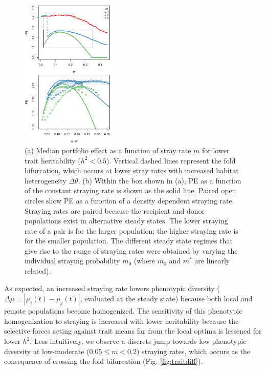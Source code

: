 \documentclass[twocolumn,preprintnumbers,amsmath,amssymb,superscriptaddress]{revtex4}
\begin{document}
\begin{figure}
  \captionsetup{justification=raggedright,
singlelinecheck=false
}
\centering
\includegraphics[width=0.4\textwidth]{figs/fig_thetaPEmvm.pdf}
\caption{
(a) Median portfolio effect as a function of stray rate $m$ for lower trait heritability ($h^2 < 0.5$).
Vertical dashed lines represent the fold bifurcation, which occurs at lower stray rates with increased habitat heterogeneity $\Delta \theta$.
(b) Within the box shown in (a), PE as a function of the constant straying rate is shown as the solid line. Paired open circles show PE as a function of a density dependent straying rate. Straying rates are paired because the recipient and donor populations exist in alternative steady states. The lower straying rate of a pair is for the larger population; the higher straying rate is for the smaller population.
The different steady state regimes that give rise to the range of straying rates were obtained by varying the individual straying probability $m_0$ (where $m_0$ and $m^*$ are linearly related).
} \label{fig:thetaPE}
\end{figure}



As expected, an increased straying rate lowers phenotypic diversity ($\Delta \mu = |\mu_i(t)-\mu_j(t)|$, evaluated at the steady state) because both local and remote populations become homogenized.
The sensitivity of this phenotypic homogenization to straying is increased with lower heritability because the selective forces acting against trait means far from the local optima is lessened for lower $h^2$.
Less intuitively, we observe a discrete jump towards low phenotypic diversity at low-moderate ($0.05 \leq m < 0.2$) straying rates, which occurs as the consequence of crossing the fold bifurcation (Fig. \ref{fig:traitdiff}).
\\
\end{document}
